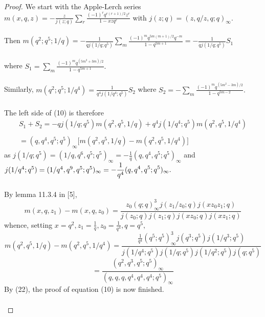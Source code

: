 \documentclass[10pt,reqno]{amsart}
\begin{document}
\begin{proof}
We start with the Apple-Lerch series $m(x,q,z)=-\displaystyle\frac{z}{j(z;q)}\displaystyle\sum_{r}\displaystyle\frac{(-1)^rq^{r(r+1)/2}z^r}{1-xzq^r}$ with $j(z;q)=(z,q/z,q;q)_{\infty}.$ \\ \\
Then $m(q^2;q^5;1/q)=-\displaystyle\frac{1}{qj(1/q;q^5)}\displaystyle\sum_{m}\displaystyle\frac{(-1)^mq^{5m(m+1)/2}q^{-m}}{1-q^{5m+1}}=-\displaystyle\frac{1}{qj(1/q;q^5)}S_1$ \\ \\
where $S_1=\displaystyle\sum_{m}\displaystyle\frac{(-1)^mq^{(5m^2+3m)/2}}{1-q^{5m+1}}.$ \\ \\
Similarly, $m(q^2;q^5;1/q^4)=\displaystyle\frac{1}{q^4j(1/q^4;q^5)}S_2$ where $S_2=-\displaystyle\sum_{m}\displaystyle\frac{(-1)^mq^{(5m^2-3m)/2}}{1-q^{5m-2}}.$\\ \\
The left side of (10) is therefore 
\begin{multline}
S_1+S_2=-qj(1/q;q^5)m(q^2,q^5,1/q)+q^4j(1/q^4;q^5)m(q^2,q^5,1/q^4)\\ \\
=(q,q^4,q^5;q^5)_{\infty}\Bigg[m(q^2,q^5,1/q)-m(q^2,q^5,1/q^4)\Bigg]
\end{multline}
as $j(1/q;q^5)=(1/q,q^6,q^5;q^5)_{\infty}=-\displaystyle\frac{1}{q}(q,q^4,q^5;q^5)_{\infty}$ and $j(1/q^4;q^5)=(1/q^4,q^9,q^5;q^5)_{\infty}\\ \\=-\displaystyle\frac{1}{q^4}(q,q^4,q^5;q^5)_{\infty}.$ \\ \\
By lemma 11.3.4 in [5], 
\begin{equation*}
    m(x,q,z_1)-m(x,q,z_0)=\displaystyle\frac{z_0(q;q)_{\infty}^3j(z_1/z_0;q)j(xz_0z_1;q)}{j(z_0;q)j(z_1;q)j(xz_0;q)j(xz_1;q)}
\end{equation*}
whence, setting $x=q^2,z_1=\displaystyle\frac{1}{q},z_0=\displaystyle\frac{1}{q^4},q=q^5,$
\begin{equation*}
    m(q^2,q^5,1/q)-m(q^2,q^5,1/q^4)=\displaystyle\frac{\displaystyle\frac{1}{q^4}(q^5;q^5)_{\infty}^3j(q^3;q^5)j(1/q^3;q^5)}{j(1/q^4;q^5)j(1/q;q^5)j(1/q^2;q^5)j(q;q^5)}
\end{equation*}
\begin{equation*}
    =\displaystyle\frac{(q^2,q^3,q^5;q^5)_{\infty}}{(q,q,q,q^4,q^4,q^4;q^5)_{\infty}}
\end{equation*}
By (22), the proof of equation (10) is now finished. \\ \\

\end{proof}
\end{document}
